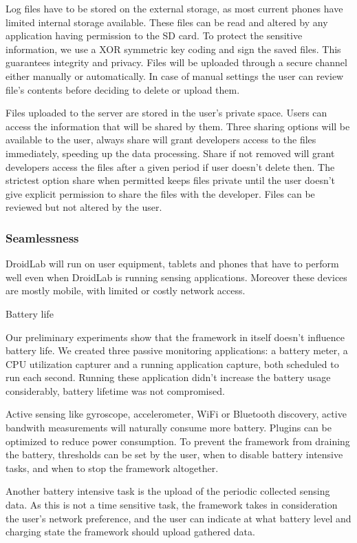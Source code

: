\documentclass[conference,letterpaper]{IEEEtran}
\begin{document}
Log files have to be stored on the external storage, as most current phones have limited internal storage available. These files can be read and altered by any application having permission to the SD card. To protect the sensitive information, we use a XOR symmetric key coding and sign the saved files. This guarantees integrity and privacy. Files will be uploaded through a secure channel either manually or automatically. In case of manual settings the user can review file's contents before deciding to delete or upload them.

Files uploaded to the server are stored in the user's private space. Users can access the information that will be shared by them. Three sharing options will be available to the user, always share will grant developers access to the files immediately, speeding up the data processing. Share if not removed will grant developers access the files after a given period if user doesn't delete then. The strictest option share when permitted keeps files private until the user doesn't give explicit permission to share the files with the developer. Files can be reviewed but not altered by the user.

\subsubsection{Seamlessness}

DroidLab will run on user equipment, tablets and phones that have to perform well even when DroidLab is running sensing applications. Moreover these devices are mostly mobile, with limited or costly network access.

Battery life

Our preliminary experiments show that the framework in itself doesn't influence battery life. We created three passive monitoring applications: a battery meter, a CPU utilization capturer and a running application capture, both scheduled to run each second. Running these application didn't increase the battery usage considerably, battery lifetime was not compromised.

Active sensing like gyroscope, accelerometer, WiFi or Bluetooth discovery, active bandwith measurements will naturally consume more battery. Plugins can be optimized to reduce power consumption. To prevent the framework from draining the battery, thresholds can be set by the user, when to disable battery intensive tasks, and when to stop the framework altogether.

Another battery intensive task is the upload of the periodic collected sensing data. As this is not a time sensitive task, the framework takes in consideration the user's network preference, and the user can indicate at what battery level and charging state the framework should upload gathered data.
\end{document}
